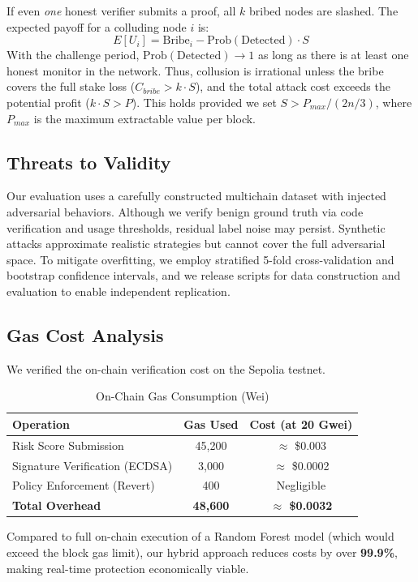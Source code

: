 If even \textit{one} honest verifier submits a proof, all $k$ bribed nodes are slashed. The expected payoff for a colluding node $i$ is:
\begin{equation}
    E[U_i] = \text{Bribe}_i - \text{Prob}(\text{Detected}) \cdot S
\end{equation}
With the challenge period, $\text{Prob}(\text{Detected}) \to 1$ as long as there is at least one honest monitor in the network. Thus, collusion is irrational unless the bribe covers the full stake loss ($C_{bribe} > k \cdot S$), and the total attack cost exceeds the potential profit ($k \cdot S > P$). This holds provided we set $S > P_{max} / (2n/3)$, where $P_{max}$ is the maximum extractable value per block.

\subsection{Threats to Validity}
Our evaluation uses a carefully constructed multichain dataset with injected adversarial behaviors. Although we verify benign ground truth via code verification and usage thresholds, residual label noise may persist. Synthetic attacks approximate realistic strategies but cannot cover the full adversarial space. To mitigate overfitting, we employ stratified 5-fold cross-validation and bootstrap confidence intervals, and we release scripts for data construction and evaluation to enable independent replication.

\subsection{Gas Cost Analysis}
We verified the on-chain verification cost on the Sepolia testnet.
\begin{table}[htbp]
\centering
\caption{On-Chain Gas Consumption (Wei)}
\label{tab:gas}
\begin{tabular}{lcc}
\toprule
\textbf{Operation} & \textbf{Gas Used} & \textbf{Cost (at 20 Gwei)} \\
\midrule
Risk Score Submission & 45,200 & $\approx$ \$0.003 \\
Signature Verification (ECDSA) & 3,000 & $\approx$ \$0.0002 \\
Policy Enforcement (Revert) & 400 & Negligible \\
\textbf{Total Overhead} & \textbf{48,600} & \textbf{$\approx$ \$0.0032} \\
\bottomrule
\end{tabular}
\end{table}
Compared to full on-chain execution of a Random Forest model (which would exceed the block gas limit), our hybrid approach reduces costs by over \textbf{99.9\%}, making real-time protection economically viable.

